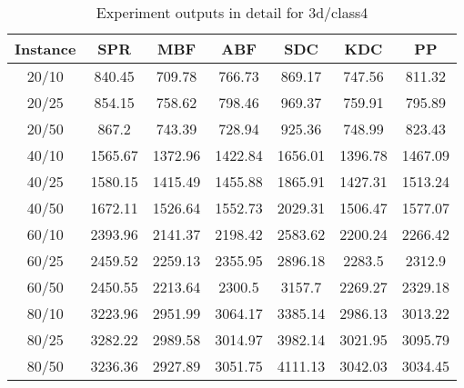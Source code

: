 \begin{table}[ht!]
    \caption{Experiment outputs in detail for 3d/class4}
    \centering
    \begin{tabular}{@{}ccccccc@{}}
        \toprule
        {\bfseries Instance} & {\bfseries SPR} & {\bfseries MBF}
        & {\bfseries ABF} & {\bfseries SDC} & {\bfseries KDC} & {\bfseries PP}\\
        \midrule
        20/10 & 840.45 & 709.78 & 766.73 & 869.17 & 747.56 & 811.32\\
        20/25 & 854.15 & 758.62 & 798.46 & 969.37 & 759.91 & 795.89\\
        20/50 & 867.2 & 743.39 & 728.94 & 925.36 & 748.99 & 823.43\\
        40/10 & 1565.67 & 1372.96 & 1422.84 & 1656.01 & 1396.78 & 1467.09\\
        40/25 & 1580.15 & 1415.49 & 1455.88 & 1865.91 & 1427.31 & 1513.24\\
        40/50 & 1672.11 & 1526.64 & 1552.73 & 2029.31 & 1506.47 & 1577.07\\
        60/10 & 2393.96 & 2141.37 & 2198.42 & 2583.62 & 2200.24 & 2266.42\\
        60/25 & 2459.52 & 2259.13 & 2355.95 & 2896.18 & 2283.5 & 2312.9\\
        60/50 & 2450.55 & 2213.64 & 2300.5 & 3157.7 & 2269.27 & 2329.18\\
        80/10 & 3223.96 & 2951.99 & 3064.17 & 3385.14 & 2986.13 & 3013.22\\
        80/25 & 3282.22 & 2989.58 & 3014.97 & 3982.14 & 3021.95 & 3095.79\\
        80/50 & 3236.36 & 2927.89 & 3051.75 & 4111.13 & 3042.03 & 3034.45\\
        \bottomrule
    \end{tabular}
\end{table}